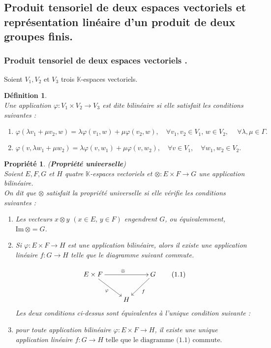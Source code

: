 \documentclass[a4paper, 14pt]{report}
\newtheorem{definition}{Définition}[section]
\newtheorem{propriety}{Propriété}[section]
\begin{document}
\begin{onehalfspace}
{\subsection{Produit tensoriel de deux espaces vectoriels et représentation linéaire d'un produit de deux groupes finis.}


\subsubsection{Produit tensoriel de deux espaces vectoriels .}

Soient \( V_1 , V_2 \) et \(V_3\) trois \(\mathbb{K}\)-espaces vectoriels.
\begin{definition} \cite{greub2012linear}\\
	Une application \(\varphi : V_1 \times V_2 \to V_3 \) est dite bilinéaire si elle satisfait les conditions suivantes :
	\begin{enumerate}[label=\roman*)]
		\item \(\varphi(\lambda v_1 + \mu v_2, w) = \lambda \varphi(v_1, w) + \mu \varphi(v_2, w), \quad \forall v_1, v_2 \in V_1, \, w \in V_2, \ \quad \forall \lambda, \mu \in \Gamma. \)
		
		\item \(\varphi(v, \lambda w_1 + \mu w_2) = \lambda \varphi(v, w_1) + \mu \varphi(v, w_2), \quad \forall v \in V_1, \quad \forall w_1, w_2 \in V_2.\)
	\end{enumerate}
\end{definition}

\begin{propriety}(\textbf{Propriété universelle}) \cite{greub2012linear}\\
	Soient \( E,F ,G \) et \(H\) quatre \(\mathbb{K}\)-espaces vectoriels et \(\otimes : E \times F \to G \) une application bilinéaire. \\
	On dit que $\otimes$ satisfait la \textit{propriété universelle} si elle vérifie les conditions suivantes :
	\begin{enumerate} [label=\roman*)]
		\item Les vecteurs $x \otimes y$ $(x \in E, \, y \in F)$ engendrent $G$, ou équivalemment, $\mathrm{Im} \, \otimes = G$.
		\item Si \(\varphi : E \times F \to H \) est une application bilinéaire, alors il existe une application linéaire $f : G \to H$ telle que le diagramme suivant commute.
		
		\[
		\xymatrix{
			E \times F \ar[rr]^{\otimes} \ar[dr]_{\varphi} & & G \ar[dl]^{f} \\
			& H &
		}  \quad \quad \text{(1.1)}
		\] 
		Les deux conditions ci-dessus sont équivalentes à l'unique condition suivante :
		\item pour toute application bilinéaire  $\varphi : E \times F \to H$,  il existe une unique application linéaire \(f : G \to H \text{ telle que le diagramme (1.1) commute.}\)
	\end{enumerate}
\end{propriety}


}
\end{onehalfspace}
\end{document}
